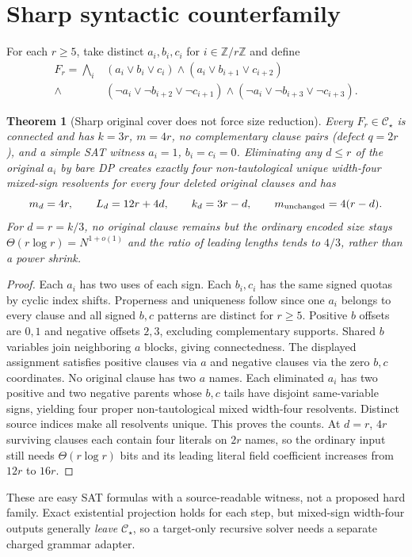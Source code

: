 \documentclass[11pt]{article}
\newtheorem{theorem}{Theorem}
\newcommand{\CS}{\mathcal C_\star}
\begin{document}
\section{Sharp syntactic counterfamily}
For each $r\ge5$, take distinct $a_i,b_i,c_i$ for
$i\in\mathbb Z/r\mathbb Z$ and define
\[
\begin{aligned}
F_r=\bigwedge_i
 &(a_i\vee b_i\vee c_i)
 \wedge(a_i\vee b_{i+1}\vee c_{i+2})\\
 {}\wedge&
 (\neg a_i\vee\neg b_{i+2}\vee\neg c_{i+1})
 \wedge(\neg a_i\vee\neg b_{i+3}\vee\neg c_{i+3}).
\end{aligned}
\]
\begin{theorem}[Sharp original cover does not force size reduction]
Every $F_r\in\CS$ is connected and has $k=3r$, $m=4r$,
no complementary clause pairs (defect $q=2r$), and a simple SAT
witness $a_i=1$, $b_i=c_i=0$.
Eliminating any $d\le r$ of the original $a_i$ by bare DP creates
exactly four non-tautological unique width-four mixed-sign
resolvents for every four deleted original clauses and has
\[
m_d=4r,\qquad L_d=12r+4d,\qquad k_d=3r-d,\qquad
m_{\rm unchanged}=4(r-d).
\]
For $d=r=k/3$, no original clause remains but the ordinary
encoded size stays $\Theta(r\log r)=N^{1+o(1)}$ and the ratio
of leading lengths tends to $4/3$, rather than a power shrink.
\end{theorem}
\begin{proof}
Each $a_i$ has two uses of each sign. Each $b_i,c_i$
has the same signed quotas by cyclic index shifts. Properness
and uniqueness follow since one $a_i$ belongs to every clause
and all signed $b,c$ patterns are distinct for $r\ge5$.
Positive $b$ offsets are $0,1$ and negative offsets $2,3$,
excluding complementary supports. Shared $b$ variables join
neighboring $a$ blocks, giving connectedness. The displayed
assignment satisfies positive clauses via $a$ and negative
clauses via the zero $b,c$ coordinates. No original clause
has two $a$ names. Each eliminated $a_i$ has two positive
and two negative parents whose $b,c$ tails have disjoint
same-variable signs, yielding four proper non-tautological
mixed width-four resolvents. Distinct source indices make
all resolvents unique. This proves the counts. At $d=r$,
$4r$ surviving clauses each contain four literals on
$2r$ names, so the ordinary input still needs
$\Theta(r\log r)$ bits and its leading literal field
coefficient increases from $12r$ to $16r$.
\end{proof}
These are easy SAT formulas with a source-readable witness,
not a proposed hard family. Exact existential projection holds
for each step, but mixed-sign width-four outputs generally
\emph{leave} $\CS$, so a target-only recursive solver needs a
separate charged grammar adapter.
\end{document}
